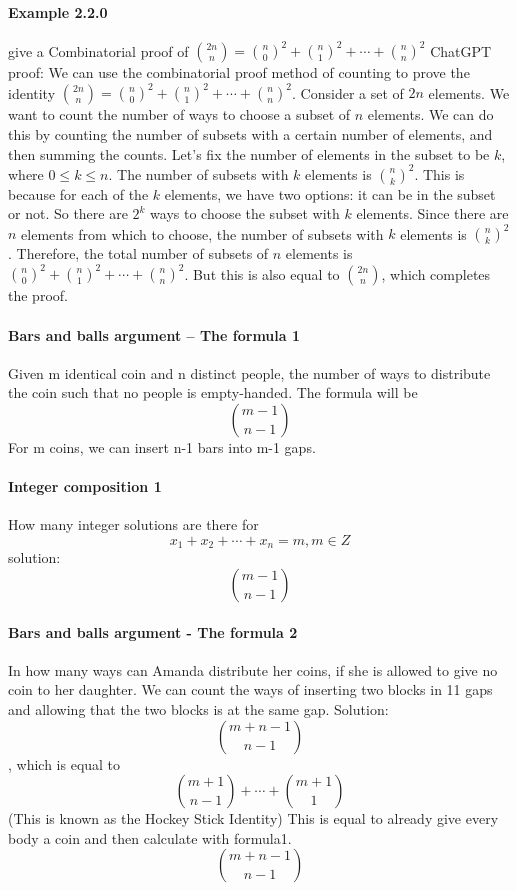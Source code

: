 \documentclass{article}
\begin{document}
\paragraph{Example 2.2.0}
give a Combinatorial proof of $\binom{2n}{n} =\binom{n}{0}^2+\binom{n}{1}^2+\cdots +\binom{n}{n}^2$\newline
ChatGPT proof:\newline
We can use the combinatorial proof method of counting to prove the identity $\binom{2n}{n} =\binom{n}{0}^2+\binom{n}{1}^2+\cdots +\binom{n}{n}^2$.\newline
Consider a set of $2n$ elements. We want to count the number of ways to choose a subset of $n$ elements. We can do this by counting the number of subsets with a certain number of elements, and then summing the counts.\newline
Let's fix the number of elements in the subset to be $k$, where $0 \leq k \leq n$. The number of subsets with $k$ elements is $\binom{n}{k}^2$. This is because for each of the $k$ elements, we have two options: it can be in the subset or not. So there are $2^k$ ways to choose the subset with $k$ elements. Since there are $n$ elements from which to choose, the number of subsets with $k$ elements is $\binom{n}{k}^2$.
\newline
Therefore, the total number of subsets of $n$ elements is $\binom{n}{0}^2+\binom{n}{1}^2+\cdots +\binom{n}{n}^2$. But this is also equal to $\binom{2n}{n}$, which completes the proof.
\paragraph{Bars and balls argument – The formula 1}
Given m identical coin and n distinct people, the number of ways to distribute the coin such that no people is empty-handed. \newline
The formula will be $$\binom{m-1}{n-1}$$
For m coins, we can insert n-1 bars into m-1 gaps.
\paragraph{Integer composition 1}
How many integer solutions are there for
$$x_1+x_2+\cdots+x_n=m, m\in Z$$
solution:
$$\binom{m-1}{n-1}$$
\paragraph{Bars and balls argument - The formula 2}
In how many ways can Amanda distribute her coins, if she is allowed to give no coin to her daughter.\newline
We can count the ways of inserting two blocks in 11 gaps and
allowing that the two blocks is at the same gap.\newline
Solution:\newline
$$\binom{m+n-1}{n-1}$$, which is equal to
$$\binom{m+1}{n-1}+\cdots +\binom{m+1}{1}$$
(This is known as the Hockey Stick Identity)\newline
This is equal to already give every body a coin and then calculate with formula1.
$$\binom{m+n-1}{n-1}$$
\end{document}

